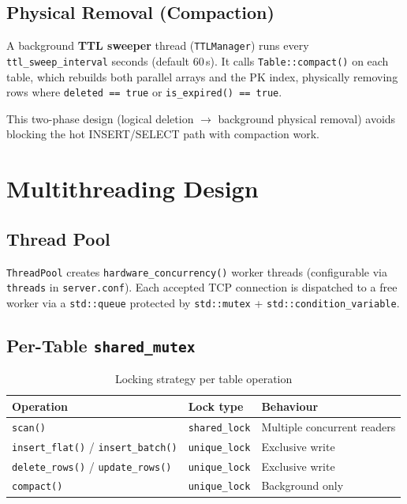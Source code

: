 \documentclass[12pt,a4paper]{article}
\begin{document}
\subsection{Physical Removal (Compaction)}

A background \textbf{TTL sweeper} thread (\texttt{TTLManager}) runs every
\texttt{ttl\_sweep\_interval} seconds (default 60\,s). It calls \texttt{Table::compact()}
on each table, which rebuilds both parallel arrays and the PK index, physically removing
rows where \texttt{deleted == true} or \texttt{is\_expired() == true}.

This two-phase design (logical deletion $\to$ background physical removal) avoids blocking
the hot INSERT/SELECT path with compaction work.

\section{Multithreading Design}

\subsection{Thread Pool}

\texttt{ThreadPool} creates \texttt{hardware\_concurrency()} worker threads (configurable
via \texttt{threads} in \texttt{server.conf}). Each accepted TCP connection is dispatched
to a free worker via a \texttt{std::queue} protected by \texttt{std::mutex} +
\texttt{std::condition\_variable}.

\subsection{Per-Table \texttt{shared\_mutex}}

\begin{table}[H]
\centering
\begin{tabularx}{\textwidth}{L{4.5cm} L{3cm} X}
\toprule
\textbf{Operation} & \textbf{Lock type} & \textbf{Behaviour} \\
\midrule
\texttt{scan()} & \texttt{shared\_lock} & Multiple concurrent readers \\
\texttt{insert\_flat()} / \texttt{insert\_batch()} & \texttt{unique\_lock} & Exclusive write \\
\texttt{delete\_rows()} / \texttt{update\_rows()} & \texttt{unique\_lock} & Exclusive write \\
\texttt{compact()} & \texttt{unique\_lock} & Background only \\
\bottomrule
\end{tabularx}
\caption{Locking strategy per table operation}
\end{table}
\end{document}
